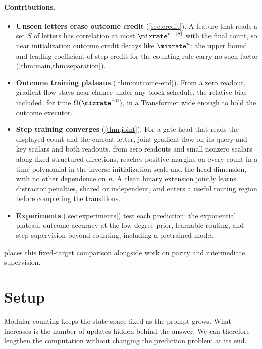 \paragraph{Contributions.}
\begin{itemize}[leftmargin=*,itemsep=2pt,topsep=3pt]
\item \textbf{Unseen letters erase outcome credit} (\cref{sec:credit}). A feature that reads a set $S$ of letters has correlation at most
$\mixrate^{n-|S|}$ with the final count, so near initialization outcome credit decays like $\mixrate^n$; the upper bound and leading coefficient of
step credit for the counting rule carry no such factor (\cref{thm:main,thm:separation}).
\item \textbf{Outcome training plateaus} (\cref{thm:outcome-end}). From a zero readout, gradient flow stays near chance under any block schedule, the relative bias included,
for time $\Omega(\mixrate^{-n})$, in a Transformer wide enough to hold the outcome executor.
\item \textbf{Step training converges} (\cref{thm:joint}). For a gate head that reads the displayed count and the current
letter, joint gradient flow on its query and key scalars and both readouts, from zero readouts and small nonzero scalars along fixed structured directions,
reaches positive margins on every count in a time polynomial in the inverse initialization scale and the head dimension, with no other dependence on $n$.
A clean binary extension jointly learns distractor penalties, shared or independent, and enters a useful routing region before completing the transitions.
\item \textbf{Experiments} (\cref{sec:experiments}) test each prediction: the exponential plateau, outcome accuracy at the
low-degree prior, learnable routing, and step supervision beyond counting, including a pretrained model.
\end{itemize}

 places this fixed-target comparison alongside work on parity and intermediate supervision.

\section{Setup}
\label{sec:setup}
\label{sec:setting}

Modular counting keeps the state space fixed as the prompt grows. What increases is the number of updates hidden behind the
answer. We can therefore lengthen the computation without changing the prediction problem at its end.

